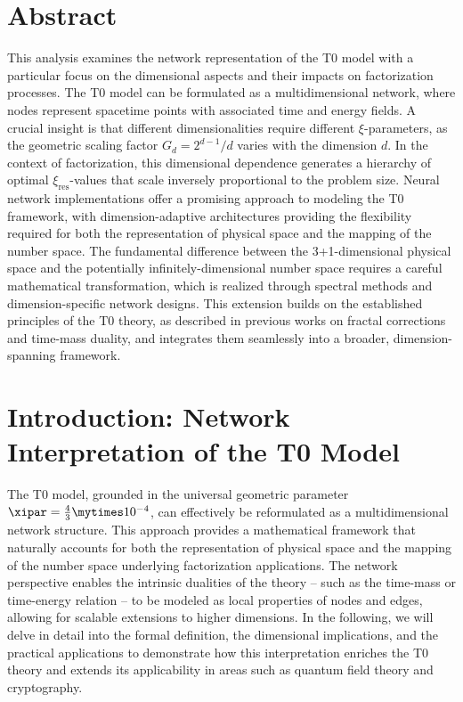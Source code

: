 \section*{Abstract}
		This analysis examines the network representation of the T0 model with a particular focus on the dimensional aspects and their impacts on factorization processes. The T0 model can be formulated as a multidimensional network, where nodes represent spacetime points with associated time and energy fields. A crucial insight is that different dimensionalities require different $\xi$-parameters, as the geometric scaling factor $G_d = 2^{d-1}/d$ varies with the dimension $d$. In the context of factorization, this dimensional dependence generates a hierarchy of optimal $\xi_{\text{res}}$-values that scale inversely proportional to the problem size. Neural network implementations offer a promising approach to modeling the T0 framework, with dimension-adaptive architectures providing the flexibility required for both the representation of physical space and the mapping of the number space. The fundamental difference between the 3+1-dimensional physical space and the potentially infinitely-dimensional number space requires a careful mathematical transformation, which is realized through spectral methods and dimension-specific network designs. This extension builds on the established principles of the T0 theory, as described in previous works on fractal corrections and time-mass duality, and integrates them seamlessly into a broader, dimension-spanning framework.

	
	
	\section{Introduction: Network Interpretation of the T0 Model}
	\label{sec:introduction}
	
	The T0 model, grounded in the universal geometric parameter $\xipar = \frac{4}{3} \mytimes 10^{-4}$, can effectively be reformulated as a multidimensional network structure. This approach provides a mathematical framework that naturally accounts for both the representation of physical space and the mapping of the number space underlying factorization applications. The network perspective enables the intrinsic dualities of the theory -- such as the time-mass or time-energy relation -- to be modeled as local properties of nodes and edges, allowing for scalable extensions to higher dimensions. In the following, we will delve in detail into the formal definition, the dimensional implications, and the practical applications to demonstrate how this interpretation enriches the T0 theory and extends its applicability in areas such as quantum field theory and cryptography.
	
